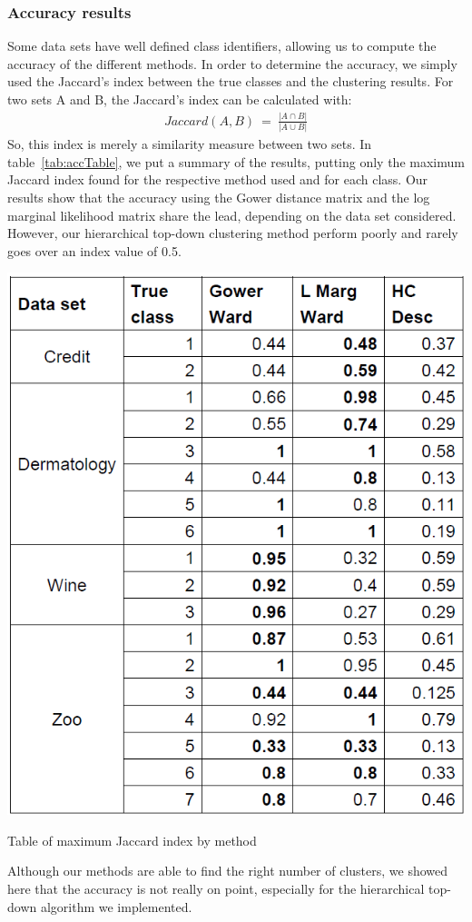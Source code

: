 \documentclass[twocolumn]{article}
\begin{document}
\subsubsection{Accuracy results}

Some data sets have well defined class identifiers, allowing us to compute the accuracy of the different methods.
In order to determine the accuracy, we simply used the Jaccard's index between the true classes and the clustering results. 
For two sets A and B, the Jaccard's index can be calculated with:
\begin{align}
    Jaccard(A,B)\ =\ \frac{|A\cap B|}{|A\cup B|}
\end{align}
So, this index is merely a similarity measure between two sets.
In table~\ref{tab:accTable}, we put a summary of the results, putting only the maximum Jaccard index found for the respective method used and for each class.
Our results show that the accuracy using the Gower distance matrix and the log marginal likelihood matrix share the lead, depending on the data set considered.
However, our hierarchical top-down clustering method perform poorly and rarely goes over an index value of 0.5.
\begin{table}[!]
    \centering
    \includegraphics[scale=0.4]{img/AccTable.png}
    \caption{Table of maximum Jaccard index by method}
    \label{tab:accTable}
\end{table}
Although our methods are able to find the right number of clusters, we showed here that the accuracy is not really on point, especially for the hierarchical top-down algorithm we implemented.
\end{document}
